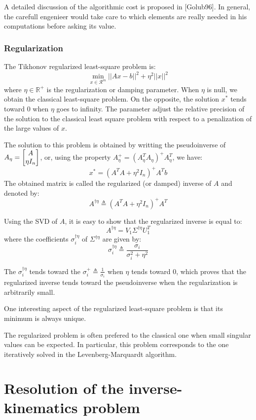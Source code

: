 \documentclass{book}
\begin{document}
A detailed discussion of the algorithmic cost is proposed in [Golub96]. In general, the carefull engenieer would take care to which elements are really needed in his computations before asking its value.

\subsection{Regularization}

The Tikhonov regularized least-square problem is:
$$ \min_{x\in\mathcal{R}^m} ||A x - b ||^2 + \eta^2 ||x||^2 $$
where $\eta\in\mathbb{R}^+$ is the regularization or damping parameter. When $\eta$ is null, we obtain the classical least-square problem. On the opposite, the solution $x^*$ tends toward 0 when $\eta$ goes to infinity. The parameter adjust the relative precision of the solution to the classical least square problem with respect to a penalization of the large values of $x$.

The solution to this problem is obtained by writting the pseudoinverse of $A_\eta = \begin{bmatrix} A \\ \eta I_n \end{bmatrix}$, or, using the property $A_\eta^+ = (A_\eta^TA_\eta)^+A_\eta^T$, we have:
$$ x^* = (A^T A + \eta^2 I_n )^+ A^T b $$
The obtained matrix is called the regularized (or damped) inverse of $A$ and denoted by:
$$ A^{\dagger \eta} \triangleq (A^T A + \eta^2 I_n )^+ A^T $$

Using the SVD of $A$, it is easy to show that the regularized inverse is equal to:
$$ A^{\dagger \eta} = V_1 \Sigma^{\dagger \eta} U_1^T $$
where the coefficients $\sigma_i^{\dagger \eta}$ of $\Sigma^{\dagger \eta}$ are given by:
$$\sigma_i^{\dagger \eta} \triangleq \frac{\sigma_i}{\sigma_i^2 + \eta^2}$$

The $\sigma_i^{\dagger \eta}$ tends toward the $\sigma_i^+ \triangleq \frac{1}{\sigma_i}$ when $\eta$ tends toward 0, which proves that the regularized inverse tends toward the pseudoinverse when the regularization is arbitrarily small.

One interesting aspect of the regularized least-square problem is that its minimum is always unique.

The regularized problem is often prefered to the classical one when small singular values can be expected. In particular, this problem corresponds to the one iteratively solved in the Levenberg-Marquardt algorithm.


\chapter{Resolution of the inverse-kinematics problem}
\end{document}
